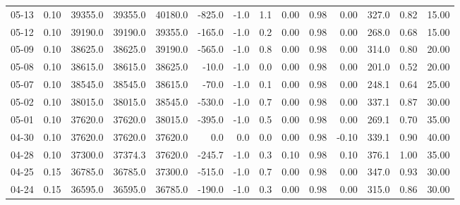 \begin{threeparttable}
{\begin{tabular}{lrrrrrrrrrrrrr}
  05-13 &     0.10 & 39355.0 & 39355.0 & 40180.0 &     -825.0 &                     -1.0 &                 1.1 &       0.00 &      0.98 &           0.00 &            327.0 &            0.82 &                  15.00 \\
  05-12 &     0.10 & 39190.0 & 39190.0 & 39355.0 &     -165.0 &                     -1.0 &                 0.2 &       0.00 &      0.98 &           0.00 &            268.0 &            0.68 &                  15.00 \\
  05-09 &     0.10 & 38625.0 & 38625.0 & 39190.0 &     -565.0 &                     -1.0 &                 0.8 &       0.00 &      0.98 &           0.00 &            314.0 &            0.80 &                  20.00 \\
  05-08 &     0.10 & 38615.0 & 38615.0 & 38625.0 &      -10.0 &                     -1.0 &                 0.0 &       0.00 &      0.98 &           0.00 &            201.0 &            0.52 &                  20.00 \\
  05-07 &     0.10 & 38545.0 & 38545.0 & 38615.0 &      -70.0 &                     -1.0 &                 0.1 &       0.00 &      0.98 &           0.00 &            248.1 &            0.64 &                  25.00 \\
  05-02 &     0.10 & 38015.0 & 38015.0 & 38545.0 &     -530.0 &                     -1.0 &                 0.7 &       0.00 &      0.98 &           0.00 &            337.1 &            0.87 &                  30.00 \\
  05-01 &     0.10 & 37620.0 & 37620.0 & 38015.0 &     -395.0 &                     -1.0 &                 0.5 &       0.00 &      0.98 &           0.00 &            269.1 &            0.70 &                  35.00 \\
  04-30 &     0.10 & 37620.0 & 37620.0 & 37620.0 &        0.0 &                      0.0 &                 0.0 &       0.00 &      0.98 &          -0.10 &            339.1 &            0.90 &                  40.00 \\
  04-28 &     0.10 & 37300.0 & 37374.3 & 37620.0 &     -245.7 &                     -1.0 &                 0.3 &       0.10 &      0.98 &           0.10 &            376.1 &            1.00 &                  35.00 \\
  04-25 &     0.15 & 36785.0 & 36785.0 & 37300.0 &     -515.0 &                     -1.0 &                 0.7 &       0.00 &      0.98 &           0.00 &            347.0 &            0.93 &                  30.00 \\
  04-24 &     0.15 & 36595.0 & 36595.0 & 36785.0 &     -190.0 &                     -1.0 &                 0.3 &       0.00 &      0.98 &           0.00 &            315.0 &            0.86 &                  30.00 \\

\end{tabular}}
\end{threeparttable}
